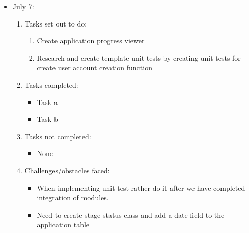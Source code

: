 	\begin{itemize}
		\item July 7:
		\begin{enumerate}
			\item Tasks set out to do:
			\begin{enumerate}
				\item Create application progress viewer
				\item Research and create template unit tests by creating unit tests for create user account creation function
			\end{enumerate}
			\item Tasks completed:
			\begin{itemize}
				\item Task a
				\item Task b
			\end{itemize}
			\item Tasks not completed:
			\begin{itemize}
				\item None
			\end{itemize}
			\item Challenges/obstacles faced:
			\begin{itemize}
				\item When implementing unit test rather do it after we have completed integration of modules.
				\item Need to create stage status class and add a date field to the application table
			\end{itemize}			
		\end{enumerate}
	\end{itemize}
	
